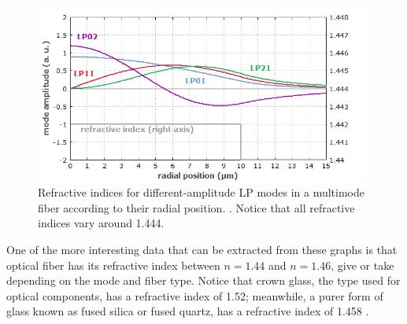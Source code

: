 \begin{figure}[htbp]
    \centering
    \includegraphics[width=11cm]{images/Appendices/step_index_fiber_modes.png}
    \caption{Refractive indices for different-amplitude LP modes in a multimode fiber according to their radial position. \cite{FiberOptics_Refractive_Index}. Notice that all refractive indices vary around 1.444.}
    \label{fig:multi-mode_fibre_refractive_index}
\end{figure}

One of the more interesting data that can be extracted from these graphs is that optical fiber has its refractive index between $n = 1.44$ and $n = 1.46$, give or take depending on the mode and fiber type. Notice that crown glass, the type used for optical components, has a refractive index of 1.52; meanwhile, a purer form of glass known as fused silica or fused quartz, has a refractive index of 1.458 \cite{Hecht:Refractive_Index}.